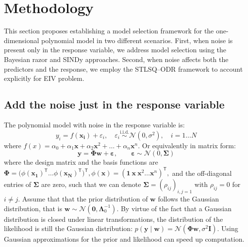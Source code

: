 \section{Methodology}
\label{sec:meth}


This section proposes establishing a model selection framework for the one-dimensional polynomial model in two different scenarios. 
First, when noise is present only in the response variable, we address model selection using the Bayesian razor and SINDy approaches. Second, when noise affects both the predictors and the response, we employ the STLSQ–ODR framework to account explicitly for EIV problem.

\subsection{Add the noise just in the response variable}
\label{subsec:noise_y}

The polynomial model with noise in the response variable is:
\begin{equation} 
\label{eq:modely_1}
y_i = f(\boldsymbol{x_i}) + \varepsilon_i, \quad  \varepsilon_i \overset{\mathrm{i.i.d.}}{\sim} \mathcal{N}(0, \sigma^2), \quad i = 1 \ldots N
\end{equation}
where $f(x) = \alpha_0 + \alpha_1\boldsymbol{x}+\alpha_2\boldsymbol{x}^2+ \ldots + \alpha_n\boldsymbol{x}^n$. Or equivalently in matrix form:
\begin{equation} 
\label{eq:modely_2}
\boldsymbol{y} = \mathbf{\Phi} \boldsymbol{w} + \boldsymbol{\varepsilon}, \qquad \boldsymbol{\varepsilon} \sim \mathcal{N}(0, \boldsymbol{\Sigma})
\end{equation}
where the design matrix and the basis functions are $\mathbf{\Phi} = \big(\phi(\boldsymbol{x_{1}})^{\mathsf{T}} \ldots\phi(\boldsymbol{x_{N}})^{\mathsf{T}}\big)^{\mathsf{T}}, 
\phi(\boldsymbol{x})= (\boldsymbol{1}\ \boldsymbol{x} \ \boldsymbol{x}^{2} \ldots \boldsymbol{x}^{n})^{\mathsf{T}},$ and the off-diagonal entries of $\boldsymbol{\Sigma}$ are zero, such that we can denote $\boldsymbol{\Sigma} = (\rho_{ij})_{i,j=1}$ with $\rho_{ij} = 0$ for $i \neq j$. Assume that that the prior distribution of $\boldsymbol{w}$ follows the Gaussian distribution, that is $\boldsymbol{w} \sim \mathcal{N}(\mathbf{0}, \mathbf{\Lambda}_0^{-1}).$ 
By virtue of the fact that a Gaussian distribution is closed under linear transformations, the distribution of the likelihood is still the Gaussian distribution: $p(\boldsymbol{y} \mid \boldsymbol{w}) = \mathcal{N}(\mathbf{\Phi} \boldsymbol{w}, \sigma^2 \mathbf{I})$.
Using Gaussian approximations for the prior and likelihood can speed up computation.

